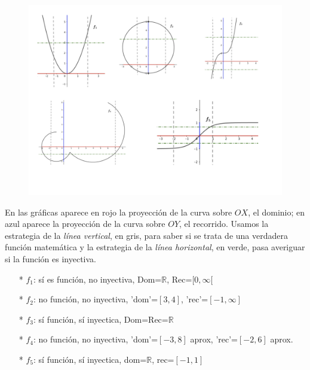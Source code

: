 {		\begin{figure}[H]
			\centering
			\includegraphics[width=1\textwidth]{imagenes/imagenes02/T02IM21.png}
			
		\end{figure}
		
		\begin{proofw}\renewcommand{\qedsymbol}{$\diamond$}
		En las gráficas aparece en rojo la proyección de la curva sobre $OX$, el dominio; en azul aparece la proyección de la curva sobre $OY$, el recorrido. Usamos la estrategia de la \emph{lí­nea vertical}, en gris, para saber si se trata de una verdadera función matemática y la estrategia de la \emph{lí­nea horizontal}, en verde, pasa averiguar si la función es inyectiva.
		
			 \begin{enumerate}
			 	\item [*] $f_1$: sí­ es función, no inyectiva, Dom=$\mathbb R$, Rec=$[0,\infty[$
			 	\item[*] $f_2$: no función, no inyectiva, 'dom'=$[3,4]$, 'rec'=$[-1,\infty]$
			 	\item [*] $f_3$: sí­ función, sí­ inyectica, Dom=Rec=$\mathbb R$
			 	\item [*] $f_4$: no función, no inyectiva, 'dom'=$[-3,8]$ aprox, 'rec'=$[-2,6]$ aprox.
			 	\item [*] $f_5$: sí­ función, sí­ inyectica, dom=$\mathbb R$, rec=$[-1,1]$
			 \end{enumerate}
		\end{proofw}
		
		
		
}
